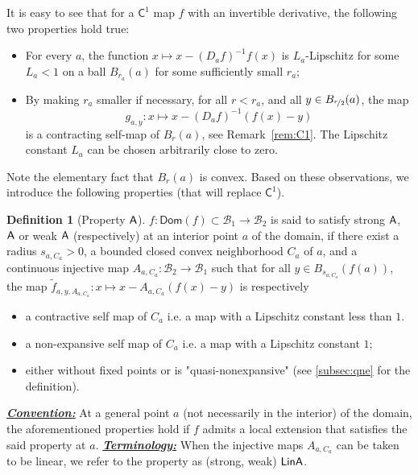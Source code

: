 \documentclass[a4, 12pt,leqno]{amsart}
\theoremstyle{plain}
\theoremstyle{definition}
\newtheorem{definition}[lemma]{Definition}
\theoremstyle{remark}
\numberwithin{equation}{section}
\newcommand{\B}{\mathcal{B}}
\begin{document}
\par It is easy to see that for a $\mathsf{C}^1$ map $f$ with an invertible derivative, the following two properties hold true:
\begin{itemize}
	\item For every $a$, the function $x \mapsto x - (D_af)^{-1}f(x)$ is $L_a$-Lipschitz for some $L_a<1$ on a ball $B_{r_a}(a)$ for some sufficiently small $r_a$;
	\item By making $r_a$ smaller if necessary, for all $r<r_a$, and all $y\in B_{\nicefrac{r}{2}}(a)$, the map
	\[
	g_{a,y}: x \mapsto x-(D_af)^{-1}(f(x)-y)
	\]
	is a contracting self-map of $B_r(a)$, see Remark~\ref{rem:C1}. The Lipschitz constant $L_a$ can be chosen arbitrarily close to zero. 
\end{itemize}

Note the elementary fact that $B_r(a)$ is convex. Based on these observations, we introduce the following properties (that will replace $\mathsf{C}^1$).
\begin{definition}[Property ${\sf A}$]\label{defn:prop-a}
	$f: \mathsf{Dom}(f) \subset \B_1 \to \B_2$ is said to satisfy strong ${\sf A}$, ${\sf A}$ or weak ${\sf A}$ (respectively) at an interior point $a$ of the domain, if there exist a radius $s_{a,C_a}>0$, a bounded closed convex neighborhood $C_a$ of $a$, and a continuous injective map $A_{a,C_a}: \B_2 \to \B_1$ such that for all $y\in B_{s_{a,C_a}}(f(a))$, the map
	$
	\tilde{f}_{a,y,A_{a,C_a}}: x \mapsto x-A_{a,C_a}(f(x)-y)
	$
	is respectively 
\begin{itemize}
		\item a contractive self map of $C_a$ i.e. a map with a Lipschitz constant less than $1$. 
	 \item a non-expansive self map of $C_a$ i.e. a map with a Lipschitz constant $1$;
		\item either without fixed points or is "quasi-nonexpansive" (see \textsection\thinspace\ref{subsec:qne} for the definition).
\end{itemize}
\end{definition}	
\noindent\underline{\small \emph{\textbf{Convention:}}} At a general point $a$ (not necessarily in the interior) of the domain, the aforementioned properties hold if $f$ admits a local extension that satisfies the said property at $a$. 
\newline\underline{\small \emph{\textbf{Terminology:}}} When the injective maps $A_{a,C_a}$ can be taken to be linear, we refer to the property as (strong, weak) ${\sf LinA}$.
\end{document}
